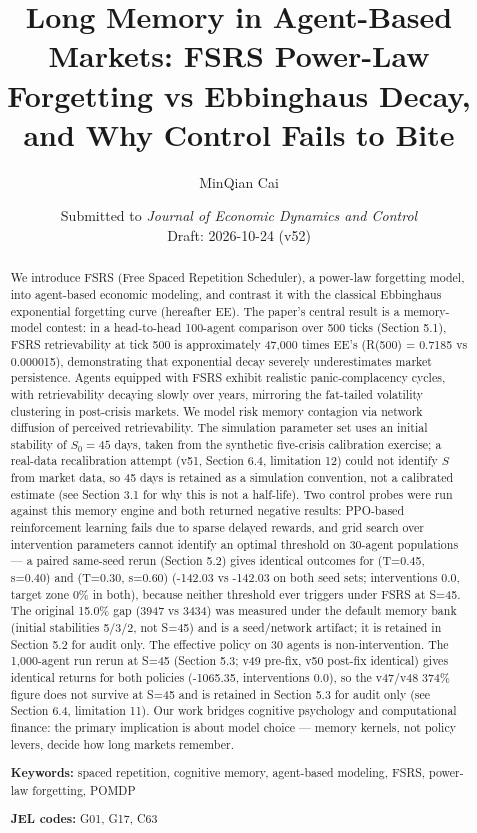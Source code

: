 \documentclass[11pt]{article}
\title{Long Memory in Agent-Based Markets: FSRS Power-Law Forgetting vs Ebbinghaus Decay, and Why Control Fails to Bite}
\author{MinQian Cai}
\date{Submitted to \textit{Journal of Economic Dynamics and Control}\\Draft: 2026-10-24 (v52)}
\begin{document}
\maketitle

\begin{abstract}
We introduce FSRS (Free Spaced Repetition Scheduler), a power-law forgetting model, into agent-based economic modeling, and contrast it with the classical Ebbinghaus exponential forgetting curve (hereafter EE). The paper's central result is a memory-model contest: in a head-to-head 100-agent comparison over 500 ticks (Section 5.1), FSRS retrievability at tick 500 is approximately 47,000 times EE's (R(500) = 0.7185 vs 0.000015), demonstrating that exponential decay severely underestimates market persistence. Agents equipped with FSRS exhibit realistic panic-complacency cycles, with retrievability decaying slowly over years, mirroring the fat-tailed volatility clustering in post-crisis markets. We model risk memory contagion via network diffusion of perceived retrievability. The simulation parameter set uses an initial stability of $S_0 = 45$ days, taken from the synthetic five-crisis calibration exercise; a real-data recalibration attempt (v51, Section 6.4, limitation 12) could not identify $S$ from market data, so 45 days is retained as a simulation convention, not a calibrated estimate (see Section 3.1 for why this is not a half-life). Two control probes were run against this memory engine and both returned negative results: PPO-based reinforcement learning fails due to sparse delayed rewards, and grid search over intervention parameters cannot identify an optimal threshold on 30-agent populations --- a paired same-seed rerun (Section 5.2) gives identical outcomes for (T=0.45, s=0.40) and (T=0.30, s=0.60) (-142.03 vs -142.03 on both seed sets; interventions 0.0, target zone 0\% in both), because neither threshold ever triggers under FSRS at S=45. The original 15.0\% gap (3947 vs 3434) was measured under the default memory bank (initial stabilities 5/3/2, not S=45) and is a seed/network artifact; it is retained in Section 5.2 for audit only. The effective policy on 30 agents is non-intervention. The 1,000-agent run rerun at S=45 (Section 5.3; v49 pre-fix, v50 post-fix identical) gives identical returns for both policies (-1065.35, interventions 0.0), so the v47/v48 374\% figure does not survive at S=45 and is retained in Section 5.3 for audit only (see Section 6.4, limitation 11). Our work bridges cognitive psychology and computational finance: the primary implication is about model choice --- memory kernels, not policy levers, decide how long markets remember.

\textbf{Keywords:} spaced repetition, cognitive memory, agent-based modeling, FSRS, power-law forgetting, POMDP

\textbf{JEL codes:} G01, G17, C63

\end{abstract}
\end{document}
